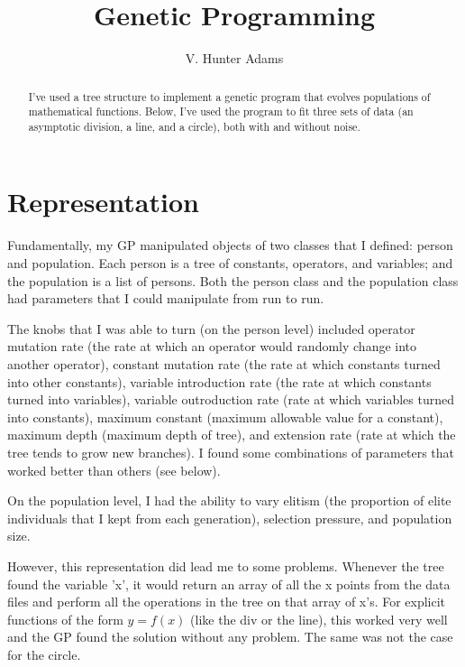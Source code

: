 \documentclass[11pt,amsmath,amssymb]{revtex4}
\begin{document}
\title{Genetic Programming}
\author{V. Hunter Adams}

\begin{abstract}
I've used a tree structure to implement a genetic program that evolves populations of mathematical functions. Below, I've used the program to fit three sets of data (an asymptotic division, a line, and a circle), both with and without noise.
\end{abstract}
\maketitle


\section{Representation}
Fundamentally, my GP manipulated objects of two classes that I defined: person and population. Each person is a tree of constants, operators, and variables; and the population is a list of persons. Both the person class and the population class had parameters that I could manipulate from run to run.

The knobs that I was able to turn (on the person level) included operator mutation rate (the rate at which an operator would randomly change into another operator), constant mutation rate (the rate at which constants turned into other constants), variable introduction rate (the rate at which constants turned into variables), variable outroduction rate (rate at which variables turned into constants), maximum constant (maximum allowable value for a constant), maximum depth (maximum depth of tree), and extension rate (rate at which the tree tends to grow new branches). I found some combinations of parameters that worked better than others (see below).

On the population level, I had the ability to vary elitism (the proportion of elite individuals that I kept from each generation), selection pressure, and population size.

However, this representation did lead me to some problems. Whenever the tree found the variable 'x', it would return an array of all the x points from the data files and perform all the operations in the tree on that array of x's. For explicit functions of the form $y=f(x)$ (like the div or the line), this worked very well and the GP found the solution without any problem. The same was not the case for the circle.
\end{document}
